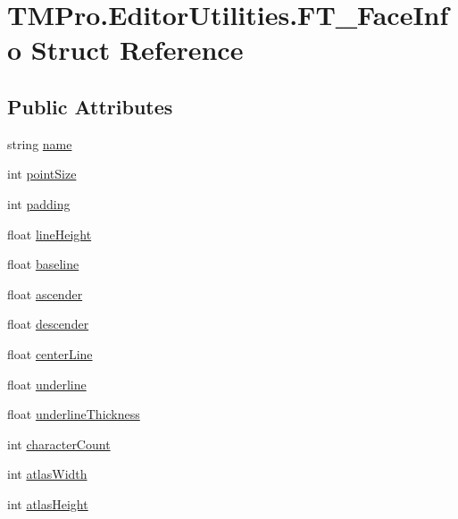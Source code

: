 \hypertarget{struct_t_m_pro_1_1_editor_utilities_1_1_f_t___face_info}{}\section{T\+M\+Pro.\+Editor\+Utilities.\+F\+T\+\_\+\+Face\+Info Struct Reference}
\label{struct_t_m_pro_1_1_editor_utilities_1_1_f_t___face_info}
\subsection*{Public Attributes}
\begin{DoxyCompactItemize}
\item 
string \mbox{\hyperlink{struct_t_m_pro_1_1_editor_utilities_1_1_f_t___face_info_a1a08f3ac33de7eb6f711b528eb8f45a3}{name}}
\item 
int \mbox{\hyperlink{struct_t_m_pro_1_1_editor_utilities_1_1_f_t___face_info_a7968d4d36edadfe7e5b843266902426d}{point\+Size}}
\item 
int \mbox{\hyperlink{struct_t_m_pro_1_1_editor_utilities_1_1_f_t___face_info_aa8d10f2840bf6c95849ec8cba3398542}{padding}}
\item 
float \mbox{\hyperlink{struct_t_m_pro_1_1_editor_utilities_1_1_f_t___face_info_ae5e916a5e9ccf1161e7fcba2186ef559}{line\+Height}}
\item 
float \mbox{\hyperlink{struct_t_m_pro_1_1_editor_utilities_1_1_f_t___face_info_a65a4895e2fa49184c6020c354914b477}{baseline}}
\item 
float \mbox{\hyperlink{struct_t_m_pro_1_1_editor_utilities_1_1_f_t___face_info_a0e43e3ae61b65ec4a6cd937910d0d368}{ascender}}
\item 
float \mbox{\hyperlink{struct_t_m_pro_1_1_editor_utilities_1_1_f_t___face_info_a6d6a4931510c617618e8b979ef86f8f2}{descender}}
\item 
float \mbox{\hyperlink{struct_t_m_pro_1_1_editor_utilities_1_1_f_t___face_info_a6fe893ebe0a4bb87ec4d35ff2cb93c9f}{center\+Line}}
\item 
float \mbox{\hyperlink{struct_t_m_pro_1_1_editor_utilities_1_1_f_t___face_info_abf0ebbd009d09bbbba12793ff01c3bb0}{underline}}
\item 
float \mbox{\hyperlink{struct_t_m_pro_1_1_editor_utilities_1_1_f_t___face_info_afcead314177c5c01ffc4d1f90d4fa507}{underline\+Thickness}}
\item 
int \mbox{\hyperlink{struct_t_m_pro_1_1_editor_utilities_1_1_f_t___face_info_a3473efb909eb621c86ad7170541ac30f}{character\+Count}}
\item 
int \mbox{\hyperlink{struct_t_m_pro_1_1_editor_utilities_1_1_f_t___face_info_a46d4346a216be77a058fb8ff3d9cc5c5}{atlas\+Width}}
\item 
int \mbox{\hyperlink{struct_t_m_pro_1_1_editor_utilities_1_1_f_t___face_info_aeb3c31d97859aa90a9658880dc4813e6}{atlas\+Height}}
\end{DoxyCompactItemize}


